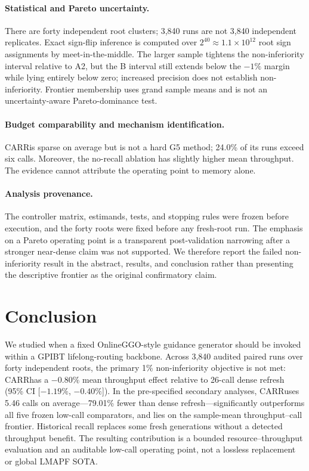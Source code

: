 \documentclass[sigconf,anonymous,review]{acmart}
\newcommand{\carr}{\textsc{CARR}}
\begin{document}
\paragraph{Statistical and Pareto uncertainty.}
There are forty independent root clusters; 3{,}840 runs are not 3{,}840
independent replicates. Exact sign-flip inference is computed over
$2^{40}\approx1.1\times10^{12}$ root sign assignments by meet-in-the-middle.
The larger sample tightens the non-inferiority interval relative to A2, but the
B interval still extends below the $-1\%$ margin while lying entirely below
zero; increased precision does not establish non-inferiority. Frontier
membership uses grand sample means and is not an uncertainty-aware
Pareto-dominance test.

\paragraph{Budget comparability and mechanism identification.}
\carr is sparse on average but is not a hard G5 method; 24.0\% of its runs
exceed six calls. Moreover, the no-recall ablation has slightly higher mean
throughput. The evidence cannot attribute the operating point to memory alone.

\paragraph{Analysis provenance.}
The controller matrix, estimands, tests, and stopping rules were frozen
before execution, and the forty roots were fixed before any fresh-root run. The
emphasis on a Pareto operating point is a transparent post-validation narrowing
after a stronger near-dense claim was not supported. We therefore report the
failed non-inferiority result in the abstract, results, and conclusion rather
than presenting the descriptive frontier as the original confirmatory claim.

\section{Conclusion}

We studied when a fixed OnlineGGO-style guidance generator should be invoked
within a GPIBT lifelong-routing backbone. Across 3{,}840 audited paired runs
over forty independent roots, the primary 1\% non-inferiority objective is not
met: \carr has a $-0.80\%$ mean throughput effect relative to 26-call dense
refresh (95\% CI [$-1.19\%$, $-0.40\%$]). In the pre-specified secondary
analyses, \carr uses 5.46 calls on average---79.01\% fewer than dense
refresh---significantly outperforms all five frozen low-call comparators, and
lies on the sample-mean throughput--call frontier. Historical recall replaces
some fresh generations without a detected throughput benefit. The resulting
contribution is a bounded resource--throughput evaluation and an auditable
low-call operating point, not a lossless replacement or global LMAPF SOTA.
\end{document}
